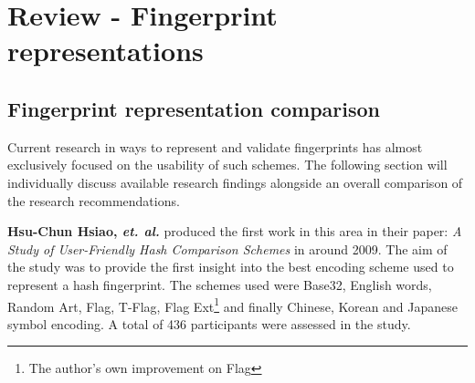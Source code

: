 


\section{Review - Fingerprint representations}

\subsection{Fingerprint representation comparison}

Current research in ways to represent and validate fingerprints has almost exclusively focused on the usability of such schemes. The following section will individually discuss available research findings alongside an overall comparison of the research recommendations.

\textbf{Hsu-Chun Hsiao, \textit{et. al.}} produced the first work in this area in their paper: \textit{A Study of User-Friendly Hash Comparison Schemes}\cite{hsiao2009study} in around 2009. The aim of the study was to provide the first insight into the best encoding scheme used to represent a hash fingerprint. The schemes used were Base32, English words, Random Art\cite{perrig1999hash}, Flag\cite{ellison2003public}, T-Flag\cite{lin2010spate}, Flag Ext\footnote{The author's own improvement on Flag} and finally Chinese, Korean and Japanese symbol encoding. A total of 436 participants were assessed in the study.

